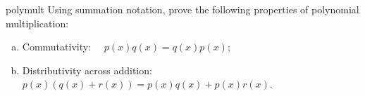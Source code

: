 
\begin {exercise}{polymult}
Using summation notation, prove the following properties of polynomial multiplication:
\begin {enumerate}[(a)]
\item
Commutativity:~~ 
$p(x) q(x) = q(x) p(x)$;
\item
Distributivity across addition:~~
$p(x) (q(x) + r(x)) =p(x)q(x) + p(x)r(x)$.
\end {enumerate}
\end {exercise}

